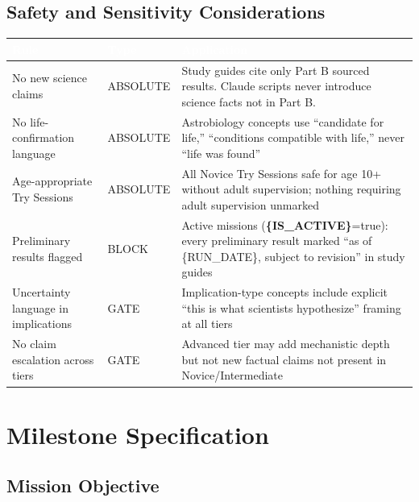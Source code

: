 \documentclass[11pt,letterpaper]{article}
\newcommand{\stageheader}[2]{%
  \noindent\colorbox{#2}{\makebox[\textwidth][l]{%
    \textcolor{white}{\bfseries\sffamily\hspace{6pt}#1\hspace{6pt}}}}%
  \vspace{0.5em}\par%
}
\newcommand{\param}[1]{\textcolor{paramred}{\textbf{\{#1\}}}}
\newcommand{\tableheader}[1]{\textbf{\sffamily\textcolor{white}{#1}}}
\begin{document}
\subsection{Safety and Sensitivity Considerations}

\begin{center}
\begin{tabularx}{\textwidth}{L{3cm}L{2cm}X}
\toprule
{}
\tableheader{Rule} & \tableheader{Type} & \tableheader{Application} \\
\midrule
No new science claims & ABSOLUTE & Study guides cite only Part B sourced results. Claude scripts never introduce science facts not in Part B. \\
No life-confirmation language & ABSOLUTE & Astrobiology concepts use ``candidate for life,'' ``conditions compatible with life,'' never ``life was found'' \\
Age-appropriate Try Sessions & ABSOLUTE & All Novice Try Sessions safe for age 10+ without adult supervision; nothing requiring adult supervision unmarked \\
Preliminary results flagged & BLOCK & Active missions (\param{IS\_ACTIVE}=true): every preliminary result marked ``as of \{RUN\_DATE\}, subject to revision'' in study guides \\
Uncertainty language in implications & GATE & Implication-type concepts include explicit ``this is what scientists hypothesize'' framing at all tiers \\
No claim escalation across tiers & GATE & Advanced tier may add mechanistic depth but not new factual claims not present in Novice/Intermediate \\
\bottomrule
\end{tabularx}
\end{center}

\newpage

\stageheader{STAGE 3 --- MISSION PACKAGE}{tertiary}

\section{Milestone Specification}

\subsection{Mission Objective}
\end{document}
